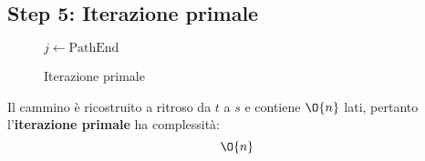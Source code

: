 \documentclass[\main/main.tex]{subfiles}
\begin{document}
\clearpage
\subsection{Step 5: Iterazione primale}
\begin{figure}
	\begin{algorithm}[H]
		\SetAlgoLined
		\(j\leftarrow \text{PathEnd}\)\;
		\caption{Iterazione primale}
	\end{algorithm}
\end{figure}
\begin{complexity}
	Il cammino è ricostruito a ritroso da \(t\) a \(s\) e contiene \(\O{n}\) lati, pertanto l'\textbf{iterazione primale} ha complessità:
	\[
		\O{n}
	\]
\end{complexity}
\end{document}
